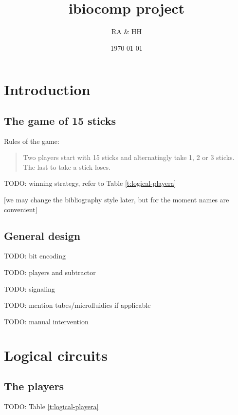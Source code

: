 \documentclass[12pt,notitlepage]{article}
\title{ibiocomp project}
\author{RA \& HH}
\date{\today}
\newcommand{\TODO}[1]{\textrm{\color{red}TODO: #1}}
\newcommand{\ra}[1]{{\color{Blue}#1}}
\begin{document}
\maketitle




\section{Introduction}

\subsection{The game of 15 sticks}

Rules of the game:
%
\begin{quote}
	Two players start with 15 sticks
	and alternatingly 
	take 1, 2 or 3 sticks.
	\\
	The last to take a stick loses.
\end{quote}

\TODO{winning strategy, refer to Table \ref{t:logical-playera}}

\ra{[we may change the bibliography style later, but for the moment names are convenient]}

\subsection{General design}

\TODO{bit encoding}

\TODO{players and subtractor}

\TODO{signaling}

\TODO{mention tubes/microfluidics if applicable}

\TODO{manual intervention}


\section{Logical circuits}

\subsection{The players}

\TODO{Table \ref{t:logical-playera}}
\end{document}
